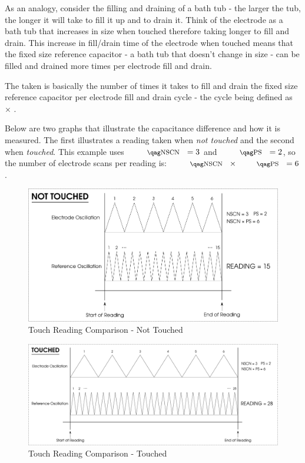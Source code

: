 \par\medskip

As an analogy, consider the filling and draining of a bath tub - the larger the
tub, the longer it will take to fill it up and to drain it.  Think of the
electrode as a bath tub that increases in size when touched therefore taking
longer to fill and drain.  This increase in fill\slash drain time of the
electrode when touched means that the fixed size reference capacitor - a bath
tub that doesn't change in size - can be filled and drained more times per
electrode fill and drain.

\par\medskip

The  taken is basically the number of times it takes to fill
and drain the fixed size reference capacitor per electrode fill and drain cycle
- the cycle being defined as  $\times$ .

\par\medskip

Below are two graphs that illustrate the capacitance difference and how it is
measured.  The first illustrates a reading taken when \textit{not touched} and
the second when \textit{touched}.  This example uses $\textrm{\sTSNS{f}} = 3$
and $\textrm{\sTSPS{f}} = 2$, so the number of electrode scans per reading is:
$\textrm{\sTSNS{f}} \times \textrm{\sTSPS{f}} = 6$.

\begin{figure}[H]
\centering
  \includegraphics{images/touch_comparison_not_touched.png}
\caption{Touch Reading Comparison - Not Touched}
\end{figure}

\begin{figure}[H]
\centering
  \includegraphics{images/touch_comparison_touched.png}
\caption{Touch Reading Comparison - Touched}
\end{figure}

